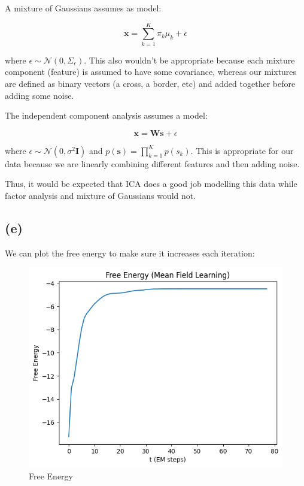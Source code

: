 \documentclass[12pt]{article}
\begin{document}
A mixture of Gaussians assumes as model:

\[\textbf{x} = \sum_{k=1}^K\pi_k \mu_k + \epsilon\]

where $\epsilon \sim \mathcal{N}(0, \Sigma_{\epsilon})$. This also wouldn't be appropriate because each mixture component (feature) is assumed to have some covariance, whereas our mixtures are defined as binary vectors (a cross, a border, etc) and added together before adding some noise.

The independent component analysis assumes a model:

\[\textbf{x} = \textbf{W}\textbf{s} + \epsilon\]

where $\epsilon \sim \mathcal{N}(0, \sigma^2\textbf{I})$ and $p(\textbf{s}) = \prod_{k=1}^K p(s_k)$. This is appropriate for our data because we are linearly combining different features and then adding noise.

Thus, it would be expected that ICA does a good job modelling this data while factor analysis and mixture of Gaussians would not.

\subsection*{(e)}

We can plot the free energy to make sure it increases each iteration:

\begin{figure}[h]
\centering
\includegraphics[scale=0.4]{outputs/q3/f-free-energy}
\caption{Free Energy}
\label{fig:3f-free-energy}
\end{figure}
\newpage
\end{document}
